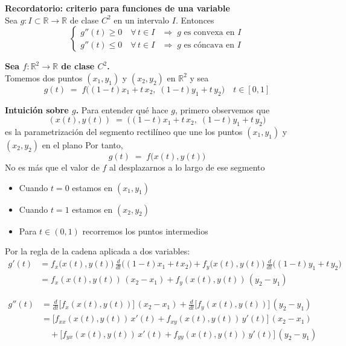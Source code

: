 \documentclass{article}
\newcommand{\R}{\ensuremath{\mathbb{R}}}
\begin{document}
\noindent\textbf{Recordatorio: criterio para funciones de una variable}\\
Sea \(g\colon I\subset\mathbb{R}\to\mathbb{R}\) de clase \(C^2\) en un intervalo \(I\). Entonces
\[
\begin{cases}
g''(t)\ge0\quad\forall\,t\in I
&\Longrightarrow\;g\text{ es convexa en }I\\[6pt]
g''(t)\le0\quad\forall\,t\in I
&\Longrightarrow\;g\text{ es cóncava en }I
\end{cases}
\]

\noindent\textbf{Sea \(f\colon\mathbb{R}^2\to\mathbb{R}\) de clase \(C^2\).}\\

Tomemos dos puntos \((x_1,y_1)\) y \((x_2,y_2)\) en \(\R^2\) y sea
\[
g(t) \;=\; f\bigl((1-t)x_1 + t\,x_2,\;(1-t)y_1 + t\,y_2\bigr)
\quad t\in[0,1]
\]

\noindent\textbf{Intuición sobre \(g\).}  
Para entender qué hace \(g\), primero observemos que  
\[
(x(t),y(t)) \;=\;\bigl((1-t)x_1 + t\,x_2,\;(1-t)y_1 + t\,y_2\bigr)
\]
es la parametrización del segmento rectilíneo que une los puntos \((x_1,y_1)\) y \((x_2,y_2)\) en el plano  
Por tanto,
\[
g(t) \;=\; f\bigl(x(t),y(t)\bigr)
\]
No es más que el valor de \(f\) al desplazarnos a lo largo de ese segmento  
\begin{itemize}
    \item Cuando \(t=0\) estamos en \((x_1,y_1)\)  
    \item Cuando \(t=1\) estamos en \((x_2,y_2)\)  
    \item Para \(t\in(0,1)\) recorremos los puntos intermedios  
\end{itemize}

Por la regla de la cadena aplicada a dos variables:
\[
\begin{aligned}
g'(t)
&= f_x\bigl(x(t),y(t)\bigr)\,\frac{d}{dt}\bigl((1-t)x_1 + t\,x_2\bigr)
 + f_y\bigl(x(t),y(t)\bigr)\,\frac{d}{dt}\bigl((1-t)y_1 + t\,y_2\bigr)\\[4pt]
&= f_x(x(t),y(t))\,(x_2 - x_1)
 + f_y(x(t),y(t))\,(y_2 - y_1)
\end{aligned}
\]

\[
\begin{aligned}
g''(t)
&= \frac{d}{dt}\bigl[f_x(x(t),y(t))\bigr]\,(x_2 - x_1)
 + \frac{d}{dt}\bigl[f_y(x(t),y(t))\bigr]\,(y_2 - y_1)\\[6pt]
&= \bigl[f_{xx}(x(t),y(t))\,x'(t)
        + f_{xy}(x(t),y(t))\,y'(t)\bigr]\,(x_2 - x_1)\\
&\quad
 + \bigl[f_{yx}(x(t),y(t))\,x'(t)
        + f_{yy}(x(t),y(t))\,y'(t)\bigr]\,(y_2 - y_1)
\end{aligned}
\]
\end{document}
